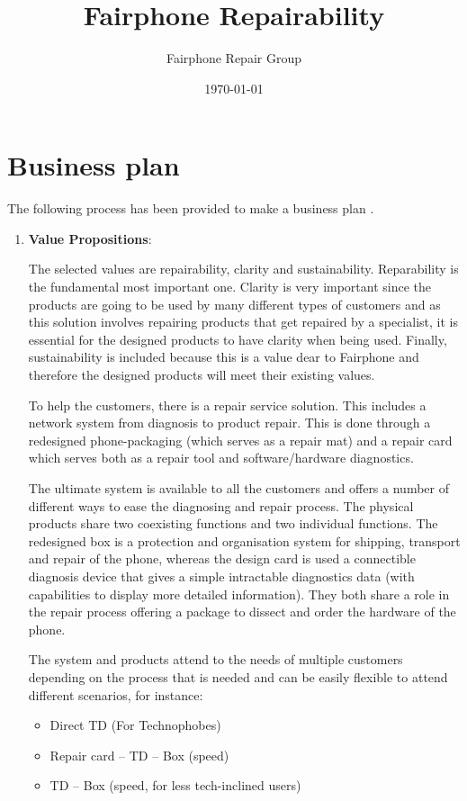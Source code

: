\documentclass[final,a4paper]{report} %
\author{Fairphone Repair Group}
\title{Fairphone Repairability}
\date{\today}
\begin{document}
	\chapter{Business plan}
	\label{ch:business-plan}
	The following process has been provided to make a business plan \cite{BusinessCanvas}.
	\begin{enumerate}
		\item \textbf{Value Propositions}:
	
	The selected values are repairability, clarity and sustainability. Reparability is the fundamental most important one. Clarity is very important since the products are going to be used by many different types of customers and as this solution involves repairing products that get repaired by a specialist, it is essential for the designed products to have clarity when being used. Finally, sustainability is included because this is a value dear to Fairphone and therefore the designed products will meet their existing values.
	
	To help the customers, there is a repair service solution. This includes a network system from diagnosis to product repair. This is done through a redesigned phone-packaging (which serves as a repair mat) and a repair card which serves both as a repair tool and software/hardware diagnostics.
	
	The ultimate system is available to all the customers and offers a number of different ways to ease the diagnosing and repair process. The physical products share two coexisting functions and two individual functions. The redesigned box is a protection and organisation system for shipping, transport and repair of the phone, whereas the design card is used a connectible diagnosis device that gives a simple intractable diagnostics data (with capabilities to display more detailed information). They both share a role in the repair process offering a package to dissect and order the hardware of the phone.
	
	The system and products attend to the needs of multiple customers depending on the process that is needed and can be easily flexible to attend different scenarios, for instance:
	\begin{itemize}
		\item Direct TD (For Technophobes) 
		\item Repair card – TD – Box (speed)
		\item TD – Box (speed, for less tech-inclined users)
	\end{itemize}
	

\end{enumerate}
\end{document}

